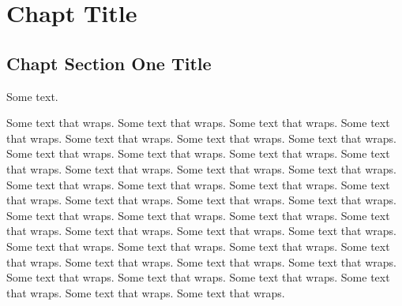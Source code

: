 \chapter{Chapt Title}\label{chap:chapt}

\section{Chapt Section One Title}

Some text.

Some text that wraps. 
Some text that wraps. 
Some text that wraps. 
Some text that wraps. 
Some text that wraps. 
Some text that wraps. 
Some text that wraps. 
Some text that wraps. 
Some text that wraps. 
Some text that wraps. 
Some text that wraps. 
Some text that wraps. 
Some text that wraps. 
Some text that wraps. 
Some text that wraps. 
Some text that wraps. 
Some text that wraps. 
Some text that wraps. 
Some text that wraps. 
Some text that wraps. 
Some text that wraps. 
Some text that wraps. 
Some text that wraps. 
Some text that wraps. 
Some text that wraps. 
Some text that wraps. 
Some text that wraps. 
Some text that wraps. 
Some text that wraps. 
Some text that wraps. 
Some text that wraps. 
Some text that wraps. 
Some text that wraps. 
Some text that wraps. 
Some text that wraps. 
Some text that wraps. 
Some text that wraps. 
Some text that wraps. 
Some text that wraps. 
Some text that wraps. 
Some text that wraps. \cite{patterson08}
